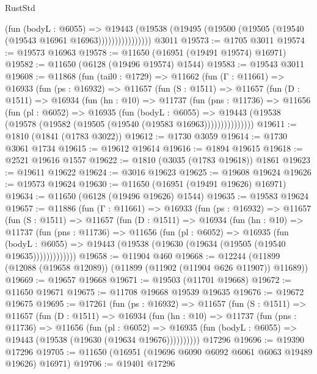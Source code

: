 \begin{lexlean}{RustStd}
\begin{coremodule}
                      (fun (bodyL : @6055) =>
                      @19443
                        (@19538
                          (@19495 (@19500 (@19505 (@19540 (@19543 @16961 @16963))))))))))))))))
    @3011
@19573 := @1705 @3011
@19574 := @19573 @16963
@19578 := @11650 (@16951 (@19491 @19574) @16971)
@19582 := @11650 (@6128 (@19496 @19574) @1544)
@19583 := @19543 @3011
@19608 := @11868
    (fun (tail0 : @1729) =>
    @11662
      (fun (Γ : @11661) =>
      @16933
        (fun (ps : @16932) =>
        @11657
          (fun (S : @1511) =>
          @11657
            (fun (D : @1511) =>
            @16934
              (fun (hn : @10) =>
              @11737
                (fun (pns : @11736) =>
                @11656
                  (fun (pl : @6052) =>
                  @16935
                    (fun (bodyL : @6055) =>
                    @19443 (@19538 (@19578 (@19582 (@19505 (@19540 (@19583 @16963)))))))))))))))
@19611 := @1810 (@1841 (@1783 @3022))
@19612 := @1730 @3059
@19614 := @1730 @3061 @1734
@19615 := @19612 @19614
@19616 := @1894 @19615
@19618 := @2521 @19616 @1557
@19622 := @1810 (@3035 (@1783 @19618)) @1861
@19623 := @19611 @19622
@19624 := @3016 @19623
@19625 := @19608 @19624
@19626 := @19573 @19624
@19630 := @11650 (@16951 (@19491 @19626) @16971)
@19634 := @11650 (@6128 (@19496 @19626) @1544)
@19635 := @19583 @19624
@19657 := @11886
    (fun (Γ : @11661) =>
    @16933
      (fun (ps : @16932) =>
      @11657
        (fun (S : @1511) =>
        @11657
          (fun (D : @1511) =>
          @16934
            (fun (hn : @10) =>
            @11737
              (fun (pns : @11736) =>
              @11656
                (fun (pl : @6052) =>
                @16935
                  (fun (bodyL : @6055) =>
                  @19443 (@19538 (@19630 (@19634 (@19505 (@19540 @19635)))))))))))))
@19658 := @11904 @460
@19668 := @12244 (@11899 (@12088 (@19658 @12089)) (@11899 (@11902 (@11904 @626 @11907)) @11689))
@19669 := @19657 @19668
@19671 := @19503 (@11701 @19668)
@19672 := @11650 @19671
@19675 := @11708 @19668 @19539 @19635
@19676 := @19672 @19675
@19695 := @17261
    (fun (ps : @16932) =>
    @11657
      (fun (S : @1511) =>
      @11657
        (fun (D : @1511) =>
        @16934
          (fun (hn : @10) =>
          @11737
            (fun (pns : @11736) =>
            @11656
              (fun (pl : @6052) =>
              @16935 (fun (bodyL : @6055) => @19443 (@19538 (@19630 (@19634 @19676))))))))))
    @17296
@19696 := @19390 @17296
@19705 := @11650 (@16951 (@19696 @6090 @6092 @6061 @6063 @19489 @19626) @16971)
@19706 := @19401 @17296

\end{coremodule}
\end{lexlean}
